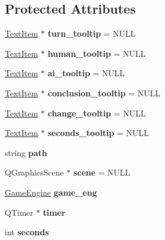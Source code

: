 \subsection*{Protected Attributes}
\begin{DoxyCompactItemize}
\item 
\hyperlink{class_text_item}{Text\+Item} $\ast$ {\bfseries turn\+\_\+tooltip} = N\+U\+LL\hypertarget{class_game_view_ad2bffcf684b7e40e9253b803f7e551e3}{}\label{class_game_view_ad2bffcf684b7e40e9253b803f7e551e3}

\item 
\hyperlink{class_text_item}{Text\+Item} $\ast$ {\bfseries human\+\_\+tooltip} = N\+U\+LL\hypertarget{class_game_view_a94384f3324a363d01a6a032fcc5343d3}{}\label{class_game_view_a94384f3324a363d01a6a032fcc5343d3}

\item 
\hyperlink{class_text_item}{Text\+Item} $\ast$ {\bfseries ai\+\_\+tooltip} = N\+U\+LL\hypertarget{class_game_view_a91eca658fe5c578738ac3df698b2c764}{}\label{class_game_view_a91eca658fe5c578738ac3df698b2c764}

\item 
\hyperlink{class_text_item}{Text\+Item} $\ast$ {\bfseries conclusion\+\_\+tooltip} = N\+U\+LL\hypertarget{class_game_view_a2594d4271aa9afcde50aab83ef78f385}{}\label{class_game_view_a2594d4271aa9afcde50aab83ef78f385}

\item 
\hyperlink{class_text_item}{Text\+Item} $\ast$ {\bfseries change\+\_\+tooltip} = N\+U\+LL\hypertarget{class_game_view_a9f2dcc56b12ec541b5a7882ec1abb2e7}{}\label{class_game_view_a9f2dcc56b12ec541b5a7882ec1abb2e7}

\item 
\hyperlink{class_text_item}{Text\+Item} $\ast$ {\bfseries seconds\+\_\+tooltip} = N\+U\+LL\hypertarget{class_game_view_a28bfa10f16a992c83d36994c334e208c}{}\label{class_game_view_a28bfa10f16a992c83d36994c334e208c}

\item 
string {\bfseries path}\hypertarget{class_game_view_a396325f196775191890d3262ecb5e9ff}{}\label{class_game_view_a396325f196775191890d3262ecb5e9ff}

\item 
Q\+Graphics\+Scene $\ast$ {\bfseries scene} = N\+U\+LL\hypertarget{class_game_view_aa96ff0163839f95478ed0de98d3e4e51}{}\label{class_game_view_aa96ff0163839f95478ed0de98d3e4e51}

\item 
\hyperlink{class_game_engine}{Game\+Engine} {\bfseries game\+\_\+eng}\hypertarget{class_game_view_a1f53dd762f200a230c3b90510c14a30a}{}\label{class_game_view_a1f53dd762f200a230c3b90510c14a30a}

\item 
Q\+Timer $\ast$ {\bfseries timer}\hypertarget{class_game_view_ab651668a749d0a823b67b5b260be2125}{}\label{class_game_view_ab651668a749d0a823b67b5b260be2125}

\item 
int {\bfseries seconds}\hypertarget{class_game_view_a005c0fe1f5c3b898ae4ec7ee4496ebab}{}\label{class_game_view_a005c0fe1f5c3b898ae4ec7ee4496ebab}

\end{DoxyCompactItemize}
